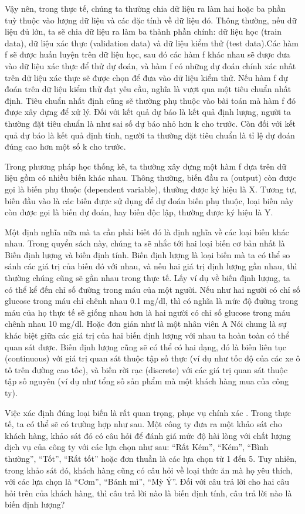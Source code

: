 \documentclass[
]{article}
\begin{document}
Vậy nên, trong thực tế, chúng ta thường chia dữ liệu ra làm hai hoặc ba phần tuỳ thuộc vào lượng dữ liệu và các đặc tính về dữ liệu đó. Thông thường, nếu dữ liệu đủ lớn, ta sẽ chia dữ liệu ra làm ba thành phần chính: dữ liệu học (train data), dữ liệu xác thực (validation data) và dữ liệu kiểm thử (test data).Các hàm f sẽ được huấn luyện trên dữ liệu học, sau đó các hàm f khác nhau sẽ được đưa vào dữ liệu xác thực để thử dự đoán, và hàm f có những dự đoán chính xác nhất trên dữ liệu xác thực sẽ được chọn để đưa vào dữ liệu kiểm thử. Nếu hàm f dự đoán trên dữ liệu kiểm thử đạt yêu cầu, nghĩa là vượt qua một tiêu chuẩn nhất định. Tiêu chuẩn nhất định cũng sẽ thường phụ thuộc vào bài toán mà hàm f đó được xây dựng để xử lý. Đối với kết quả dự báo là kết quả định lượng, người ta thường đặt tiêu chuẩn là như sai số dự báo nhỏ hơn k cho trước. Còn đối với kết quả dự báo là kết quả định tính, người ta thường đặt tiêu chuẩn là tỉ lệ dự đoán đúng cao hơn một số k cho trước.

Trong phương pháp học thống kê, ta thường xây dựng một hàm f dựa trên dữ liệu gồm có nhiều biến khác nhau. Thông thường, biến đầu ra (output) còn được gọi là biến phụ thuộc (dependent variable), thường được ký hiệu là X. Tương tự, biến đầu vào là các biến được sử dụng để dự đoán biến phụ thuộc, loại biến này còn được gọi là biến dự đoán, hay biến độc lập, thường được ký hiệu là Y.

Một định nghĩa nữa mà ta cần phải biết đó là định nghĩa về các loại biến khác nhau. Trong quyển sách này, chúng ta sẽ nhắc tới hai loại biến cơ bản nhất là Biến định lượng và biến định tính.
Biến định lượng là loại biến mà ta có thể so sánh các giá trị của biến đó với nhau, và nếu hai giá trị định lượng gần nhau, thì thường chúng cũng sẽ gần nhau trong thực tế. Lấy ví dụ về biến định lượng, ta có thể kể đến chỉ số đường trong máu của một người. Nếu như hai người có chỉ số glucose trong máu chỉ chênh nhau 0.1 mg/dl, thì có nghĩa là mức độ đường trong máu của họ thực tế sẽ giống nhau hơn là hai người có chỉ số glucose trong máu chênh nhau 10 mg/dl. Hoặc đơn giản như là một nhân viên A Nói chung là sự khác biệt giữa các giá trị của hai biến định lượng với nhau ta hoàn toàn có thể quan sát được. Biến định lượng cũng sẽ có thể có hai dạng, đó là biến liên tục (continuous) với giá trị quan sát thuộc tập số thực (ví dụ như tốc độ của các xe ô tô trên đường cao tốc), và biến rời rạc (discrete) với các giá trị quan sát thuộc tập số nguyên (ví dụ như tổng số sản phẩm mà một khách hàng mua của công ty).

Việc xác định đúng loại biến là rất quan trọng, phục vụ chính xác . Trong thực tế, ta có thể sẽ có trường hợp như sau. Một công ty đưa ra một khảo sát cho khách hàng, khảo sát đó có câu hỏi để đánh giá mức độ hài lòng với chất lượng dịch vụ của công ty với các lựa chọn như sau: ``Rất Kém'', ``Kém'', ``Bình thường'', ``Tốt'', ``Rất tốt'' hoặc đơn thuần là các lựa chọn từ 1 đến 5. Tuy nhiên, trong khảo sát đó, khách hàng cũng có câu hỏi về loại thức ăn mà họ yêu thích, với các lựa chọn là ``Cơm'', ``Bánh mì'', ``Mỳ Ý''. Đối với câu trả lời cho hai câu hỏi trên của khách hàng, thì câu trả lời nào là biến định tính, câu trả lời nào là biến định lượng?
\end{document}
